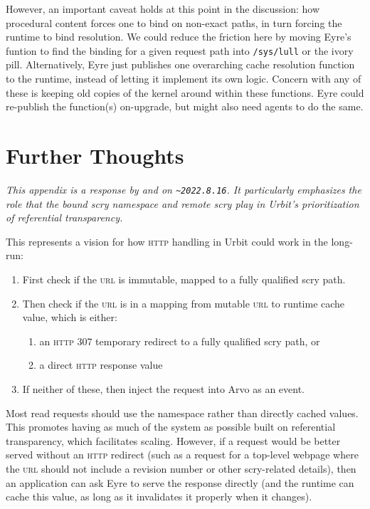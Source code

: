 \documentclass[twoside]{article}
\begin{document}
However, an important caveat holds at this point in the discussion:  how procedural content forces one to bind on non-exact paths, in turn forcing the runtime to bind resolution.  We could reduce the friction here by moving Eyre's funtion to find the binding for a given request path into \texttt{/sys/lull} or the ivory pill.  Alternatively, Eyre just publishes one overarching cache resolution function to the runtime, instead of letting it implement its own logic.  Concern with any of these is keeping old copies of the kernel around within these functions. Eyre could re-publish the function(s) on-upgrade, but might also need agents to do the same.

\section{Further Thoughts}

\noindent\sloppy
\emph{This appendix is a response by  and  on \texttt{\textasciitilde 2022.8.16}.  It particularly emphasizes the role that the bound scry namespace and remote scry play in Urbit's prioritization of referential transparency.}

This represents a vision for how \textsc{http} handling in Urbit could work in the long-run:

\begin{enumerate}
  \item  First check if the \textsc{url} is immutable, mapped to a fully qualified scry path.
  \item  Then check if the \textsc{url} is in a mapping from mutable \textsc{url} to runtime cache value, which is either:
  \begin{enumerate}
    \item  an \textsc{http} 307 temporary redirect to a fully qualified scry path, or
    \item  a direct \textsc{http} response value
  \end{enumerate}
  \item  If neither of these, then inject the request into Arvo as an event.
\end{enumerate}

Most read requests should use the namespace rather than directly cached values.  This promotes having as much of the system as possible built on referential transparency, which facilitates scaling.  However, if a request would be better served without an \textsc{http} redirect (such as a request for a top-level webpage where the \textsc{url} should not include a revision number or other scry-related details), then an application can ask Eyre to serve the response directly (and the runtime can cache this value, as long as it invalidates it properly when it changes).
\end{document}
